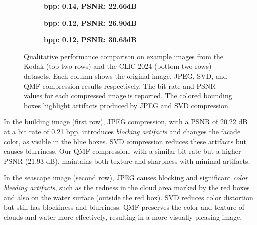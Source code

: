 \begin{figure*}[!t]
    \begin{subfigure}[t]{.25\textwidth}
        \centering
    \end{subfigure}%
    \begin{subfigure}[t]{.25\textwidth}
        \centering
        \caption{\scriptsize\textbf{bpp: 0.14, PSNR: 22.66dB}}
    \end{subfigure}%
    \begin{subfigure}[t]{.25\textwidth}
        \centering
        \caption{\scriptsize\textbf{bpp: 0.12, PSNR: 26.90dB}}
    \end{subfigure}%
    \begin{subfigure}[t]{.25\textwidth}
        \centering
        \caption{\scriptsize\textbf{bpp: 0.12, PSNR: 30.63dB}}
    \end{subfigure}

    \caption{Qualitative performance comparison on example images from the Kodak (top two rows) and the CLIC 2024 (bottom two rows) datasets. Each column shows the original image, JPEG, SVD, and QMF compression results respectively. The bit rate and PSNR values for each compressed image is reported. The colored bounding boxes highlight artifacts produced by JPEG and SVD compression.}
    \label{fig:qualitative_comparison}
\end{figure*}

In the building image (first row), JPEG compression, with a PSNR of 20.22 dB at a bit rate of 0.21 bpp, introduces \emph{blocking artifacts} and changes the facade color, as visible in the blue boxes. SVD compression reduces these artifacts but causes blurriness. Our QMF compression, with a similar bit rate but a higher PSNR (21.93 dB), maintains both texture and sharpness with minimal artifacts.

In the seascape image (second row), JPEG causes blocking and significant \emph{color bleeding artifacts}, such as the redness in the cloud area marked by the red boxes and also on the water surface (outside the red box). SVD reduces color distortion but still has blockiness and blurriness. QMF preserves the color and texture of clouds and water more effectively, resulting in a more visually pleasing image.

